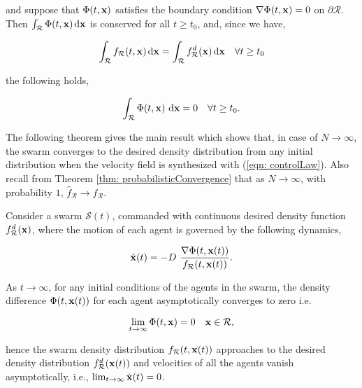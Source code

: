 \documentclass{ifacconf}
\newcommand{\Swarm}{{\mathcal S}}
\newcommand{\Rconf}{{\mathcal R}}
\newcommand{\bx}{{\bf x}}
\begin{document}
and suppose that $\Phi(t,\bx)$ satisfies the boundary condition $\nabla\Phi(t,\bx) = 0$ on $\partial\Rconf$. Then $\int_\Rconf \Phi(t,\bx) \hspace{0.5mm} \textnormal{d}\bx $ is conserved for all $t \geq t_0$, and, %
since we have,  %

\begin{equation} \label{eqn: densEqual}
	\int_\Rconf f_\Rconf(t,\bx) \hspace{0.5mm} \textnormal{d}\bx = \int_\Rconf f_\Rconf^d(\bx) \hspace{0.5mm} \textnormal{d}\bx \quad \forall t \geq t_0
\end{equation}

the following holds,

\begin{equation} \label{eqn: IntPhi}
	\int_\Rconf \Phi(t,\bx) \ \textnormal{d}\bx = 0 \quad \forall t\geq t_0.
\end{equation}


The following theorem gives the main result which shows that, in case of $N \rightarrow \infty$, the swarm converges to the desired density distribution from any initial distribution when the velocity field is synthesized with (\ref{eqn: controlLaw}). Also recall from Theorem \ref{thm: probabilisticConvergence} that as $N \rightarrow \infty$, with probability $1$, $\hat{f}_\Rconf \rightarrow f_\Rconf$. \\

\begin{thm}
	Consider a swarm $\Swarm(t)$, commanded with continuous desired density function $f_{\Rconf}^d(\bx)$, where the motion of each agent is governed by the following  dynamics,
	
	\begin{equation} \label{eqn: agentDyn}
		\dot{\bx}(t) = -D \ \frac{\nabla \Phi(t,\bx(t))}{f_\Rconf(t,\bx(t))}.
	\end{equation}
	
	As $t \rightarrow \infty$, for any initial conditions of the agents in the swarm, the density difference $\Phi(t,\bx(t))$ for each agent asymptotically converges to zero i.e.
	
	\begin{equation*}
		\lim\limits_{t \rightarrow \infty} \Phi(t,\bx) = 0 \quad \bx \in \Rconf,
	\end{equation*}
	
	hence the swarm density distribution  $f_\Rconf(t,\bx(t))$ approaches to the desired density distribution  $f_\Rconf^d(\bx(t))$ and velocities of all the agents vanish asymptotically,  i.e., $\lim_{t \rightarrow \infty} \dot{\bx}(t) = 0$.
\end{thm}
\end{document}
